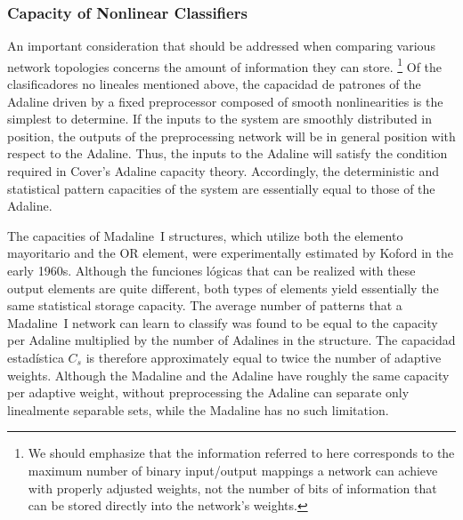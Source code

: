 \documentclass[10pt,twocolumn]{article}
\begin{document}
\subsubsection*{Capacity of Nonlinear Classifiers}
An important consideration that should be addressed when comparing various
network topologies concerns the amount of information they can store.%
\footnote{We should emphasize that the information referred to here corresponds
to the maximum number of binary input/output mappings a network can achieve with
properly adjusted weights, not the number of bits of information that can be
stored directly into the network's weights.}
Of the clasificadores no lineales mentioned above, the capacidad de patrones of the
Adaline driven by a fixed preprocessor composed of smooth nonlinearities is the
simplest to determine. If the inputs to the system are smoothly distributed in
position, the outputs of the preprocessing network will be in general position
with respect to the Adaline. Thus, the inputs to the Adaline will satisfy the
condition required in Cover's Adaline capacity theory. Accordingly, the
deterministic and statistical pattern capacities of the system are essentially
equal to those of the Adaline.

The capacities of Madaline~I structures, which utilize both the elemento mayoritario
and the OR element, were experimentally estimated by Koford in the early 1960s.
Although the funciones lógicas that can be realized with these output elements are
quite different, both types of elements yield essentially the same statistical
storage capacity. The average number of patterns that a Madaline~I network can
learn to classify was found to be equal to the capacity per Adaline multiplied by
the number of Adalines in the structure. The capacidad estadística $C_s$ is
therefore approximately equal to twice the number of adaptive weights. Although
the Madaline and the Adaline have roughly the same capacity per adaptive weight,
without preprocessing the Adaline can separate only linealmente separable sets,
while the Madaline has no such limitation.
\end{document}
